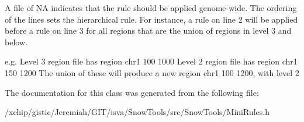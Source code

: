 A file of NA indicates that the rule should be applied genome-wide. The ordering of the lines sets the hierarchical rule. For instance, a rule on line 2 will be applied before a rule on line 3 for all regions that are the union of regions in level 3 and below.

e.g. Level 3 region file has region chr1 100 1000 Level 2 region file has region chr1 150 1200 The union of these will produce a new region chr1 100 1200, with level 2 



The documentation for this class was generated from the following file:\begin{CompactItemize}
\item 
/xchip/gistic/Jeremiah/GIT/isva/Snow\-Tools/src/Snow\-Tools/Mini\-Rules.h\end{CompactItemize}
